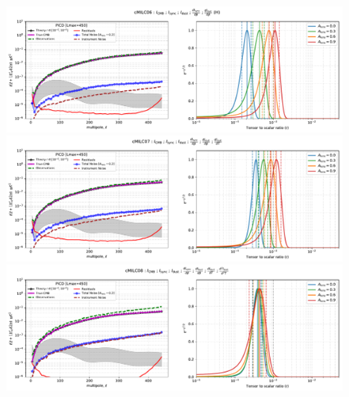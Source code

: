 \documentclass[11pt]{article}
\begin{document}
\begin{figure}
\centering
\includegraphics[width=1.2\textwidth]{ps_and_bbposterir_cMILC06.pdf}
\includegraphics[width=1.2\textwidth]{ps_and_bbposterir_cMILC07.pdf}
\includegraphics[width=1.2\textwidth]{ps_and_bbposterir_cMILC08.pdf}
\end{figure}
\end{document}
